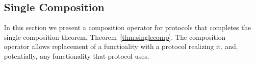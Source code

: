 %
%
%

\subsection{Single Composition}
In this section we present a composition operator for protocols that completes the single composition theorem, Theorem~\ref{thm:singlecomp}.
The composition operator allows replacement of a functioality with a protocol realizing it, and, potentially, any functionality that protocol uses.

